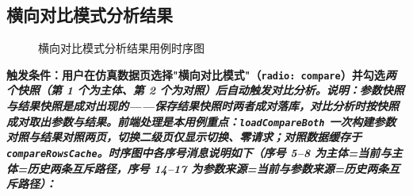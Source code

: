 \subsection{横向对比模式分析结果}\label{sec:resultAnalysis}
\begin{figure}[!h]
	\centering
	\resizebox{1.0\linewidth}{!}{}
	\caption{横向对比模式分析结果用例时序图}\label{fig:compareMode}
\end{figure}
\bf{触发条件}：用户在仿真数据页选择"横向对比模式"（\texttt{radio: compare}）并勾选\it{两个快照}（第 1 个为主体、第 2 个为对照）后自动触发对比分析。\bf{说明}：\it{参数快照与结果快照是成对出现的}——保存结果快照时两者成对落库，对比分析时按快照成对取出参数与结果。前端处理是本用例重点：\texttt{loadCompareBoth} 一次构建参数对照与结果对照两页，切换二级页仅显示切换、零请求；对照数据缓存于 \texttt{compareRowsCache}。时序图中各序号消息说明如下（序号 5--8 为\it{主体=当前}与\it{主体=历史}两条互斥路径，序号 14--17 为\it{参数来源=当前}与\it{参数来源=历史}两条互斥路径）：
